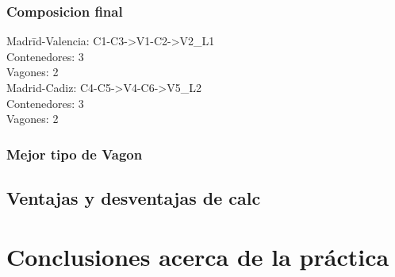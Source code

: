\documentclass[11pt,spanish]{article}
\begin{document}
			\subsubsection{Composicion final}
			\begin{tabbing}
			Madr\=id-Valencia: C1-C3->V1-C2->V2\_L1\\
			\>Contenedores: 3\\
			\>Vagones: 2\\
			Madrid-Cadiz: C4-C5->V4-C6->V5\_L2\\
			\>Contenedores: 3\\
			\>Vagones: 2
			\end{tabbing}
			\subsubsection{Mejor tipo de Vagon}
		\subsection{Ventajas y desventajas de calc}
		
	\section{Conclusiones acerca de la práctica}
	\newpage
\end{document}
